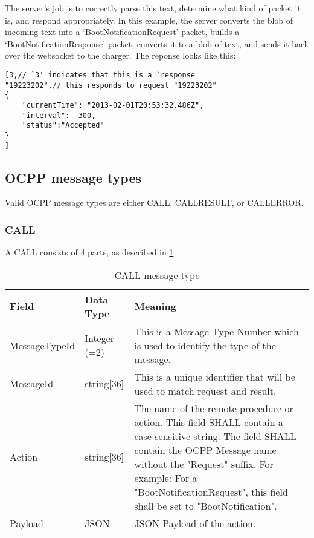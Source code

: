 \documentclass[12pt,openany,a4paper]{book}
\begin{document}
The server's job is to correctly parse this text, determine what kind of packet it is, and respond appropriately. In this example, the server converts the blob of incoming text into a `BootNotificationRequest' packet, builds a `BootNotificationResponse' packet, converts it to a blob of text, and sends it back over the websocket to the charger. The reponse looks like this:

\begin{verbatim}
[3,// `3' indicates that this is a `response'
"19223202",// this responds to request "19223202"
{
    "currentTime": "2013-02-01T20:53:32.486Z",
    "interval":  300,
    "status":"Accepted"
}
]
\end{verbatim}

\pagebreak

\subsection{OCPP message types}

Valid OCPP message types are either CALL, CALLRESULT, or CALLERROR.

\subsubsection{CALL}
A CALL consists of 4 parts, as described in \ref{tab:CALL}

\begin{table}[htp]
\begin{tabular}{ |p{3cm}|p{2.5cm}|p{9cm}| }
 \hline
\textbf{Field} & \textbf{Data Type} & \textbf{Meaning}
\\
 \hline MessageTypeId & Integer (=2)& This is a Message Type Number which is used to identify the type of the message.\\
 \hline MessageId & string[36] & This is a unique identifier that will be used to match request and result.\\
 \hline Action & string[36] & The name of the remote procedure or action. This field SHALL contain a case-sensitive string.
The field SHALL contain the OCPP Message name without the "Request" suffix. For example: For
a "BootNotificationRequest", this field shall be set to "BootNotification".\\
 \hline Payload & JSON & JSON Payload of the action.\\
 \hline
\end{tabular}
\caption{CALL message type \cite{ocpp4}}
\label{tab:CALL}
\end{table}
\end{document}
